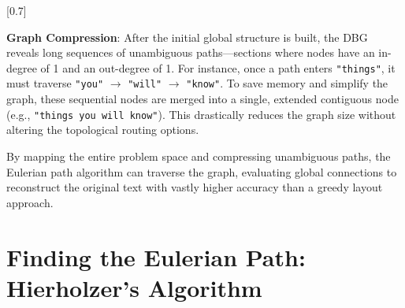 

[0.7]
\vspace{1em}


\textbf{Graph Compression}: 
After the initial global structure is built, the DBG reveals long sequences of unambiguous paths—sections where nodes have an in-degree of 1 and an out-degree of 1. For instance, once a path enters \texttt{"things"}, it must traverse \texttt{"you"} $\rightarrow$ \texttt{"will"} $\rightarrow$ \texttt{"know"}. To save memory and simplify the graph, these sequential nodes are merged into a single, extended contiguous node (e.g., \texttt{"things you will know"}). This drastically reduces the graph size without altering the topological routing options.

By mapping the entire problem space and compressing unambiguous paths, the Eulerian path algorithm can traverse the graph, evaluating global connections to reconstruct the original text with vastly higher accuracy than a greedy layout approach.


\section{Finding the Eulerian Path: Hierholzer's Algorithm}

